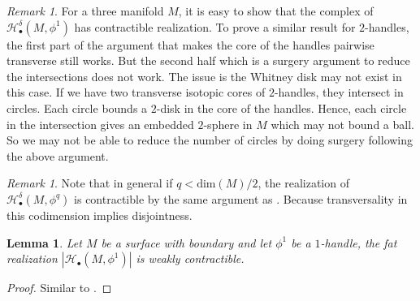 \documentclass[a4paper]{amsart}
\newtheorem{lem}[thm]{Lemma}
\theoremstyle{definition}
\theoremstyle{remark}
\newtheorem{rem}[thm]{Remark}
\numberwithin{equation}{section}
\begin{document}
%
\begin{rem}
For a three manifold $M$, it is easy to show that the complex of  $\mathcal{H}_{\bullet}^{\delta}(M,\phi^1)$ has contractible realization. To prove a similar result for $2$-handles, the first part of the argument that makes the core of the handles pairwise transverse still works. But the second half which is a surgery argument to reduce the intersections does not work. The issue is the Whitney disk may not exist in this case. If we have two transverse isotopic cores of $2$-handles, they intersect in circles. Each circle bounds a $2$-disk in the core of the handles. Hence, each circle in the intersection gives an embedded $2$-sphere in $M$ which may not bound a ball. So we may not be able  to reduce the number of circles by doing surgery following the above argument.
\end{rem} 
\begin{rem}\label{codim}
Note that in general if $q<\text{dim}(M)/2$, the realization of $\mathcal{H}_{\bullet}^{\delta}(M,\phi^q)$ is contractible by the same argument as . Because transversality in this codimension implies disjointness. 
\end{rem}
\begin{lem}
Let $M$ be a surface with boundary and let $\phi^1$ be a $1$-handle, the fat realization $|\mathcal{H}_{\bullet}(M,\phi^1)|$ is weakly contractible.
\end{lem}
\begin{proof}
Similar to .
\end{proof}
\end{document}
